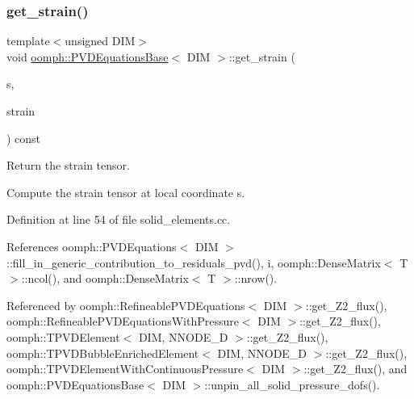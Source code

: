 \subsubsection{\texorpdfstring{get\+\_\+strain()}{get\_strain()}}
{\footnotesize\ttfamily template$<$unsigned D\+IM$>$ \\
void \hyperlink{classoomph_1_1PVDEquationsBase}{oomph\+::\+P\+V\+D\+Equations\+Base}$<$ D\+IM $>$\+::get\+\_\+strain (\begin{DoxyParamCaption}\item[{const \hyperlink{classoomph_1_1Vector}{Vector}$<$ double $>$ \&}]{s,  }\item[{\hyperlink{classoomph_1_1DenseMatrix}{Dense\+Matrix}$<$ double $>$ \&}]{strain }\end{DoxyParamCaption}) const}



Return the strain tensor. 

Compute the strain tensor at local coordinate s. 

Definition at line 54 of file solid\+\_\+elements.\+cc.



References oomph\+::\+P\+V\+D\+Equations$<$ D\+I\+M $>$\+::fill\+\_\+in\+\_\+generic\+\_\+contribution\+\_\+to\+\_\+residuals\+\_\+pvd(), i, oomph\+::\+Dense\+Matrix$<$ T $>$\+::ncol(), and oomph\+::\+Dense\+Matrix$<$ T $>$\+::nrow().



Referenced by oomph\+::\+Refineable\+P\+V\+D\+Equations$<$ D\+I\+M $>$\+::get\+\_\+\+Z2\+\_\+flux(), oomph\+::\+Refineable\+P\+V\+D\+Equations\+With\+Pressure$<$ D\+I\+M $>$\+::get\+\_\+\+Z2\+\_\+flux(), oomph\+::\+T\+P\+V\+D\+Element$<$ D\+I\+M, N\+N\+O\+D\+E\+\_\+D $>$\+::get\+\_\+\+Z2\+\_\+flux(), oomph\+::\+T\+P\+V\+D\+Bubble\+Enriched\+Element$<$ D\+I\+M, N\+N\+O\+D\+E\+\_\+D $>$\+::get\+\_\+\+Z2\+\_\+flux(), oomph\+::\+T\+P\+V\+D\+Element\+With\+Continuous\+Pressure$<$ D\+I\+M $>$\+::get\+\_\+\+Z2\+\_\+flux(), and oomph\+::\+P\+V\+D\+Equations\+Base$<$ D\+I\+M $>$\+::unpin\+\_\+all\+\_\+solid\+\_\+pressure\+\_\+dofs().

\mbox{\label{classoomph_1_1PVDEquationsBase_ad429d68f0129d5f7a38705aab386daa5}} 
